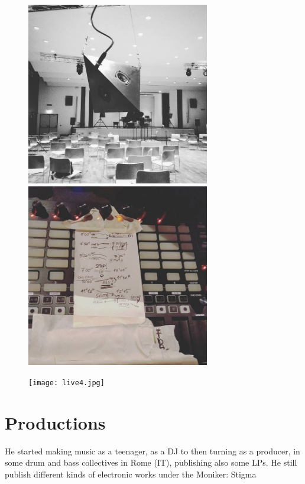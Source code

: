\documentclass[12pt,landscape]{article}
\begin{document}
{\begin{center}
\begin{figure}[!htb]
\endminipage\hfill
{}
  \includegraphics[width=8cm]{live2.jpg}

\endminipage\hfill
{}%
  \includegraphics[width=8cm]{live3.jpg}

\endminipage\hfill
{}%
  \texttt{[image: live4.jpg]}

\endminipage
\end{figure}

\clearpage


\section*{Productions}

He started making music as a teenager,
as a DJ to then turning as a producer,
\newline
in some drum and bass collectives in Rome (IT),
publishing also some LPs.
\newline
He still publish different kinds of electronic
works under the Moniker: Stigma


\end{center}}
\end{document}
